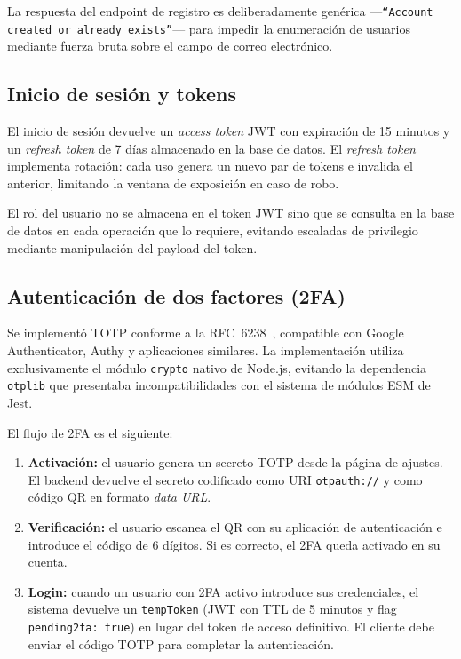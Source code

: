 La respuesta del endpoint de registro es deliberadamente genérica ---\texttt{``Account created or already exists''}--- para impedir la enumeración de usuarios mediante fuerza bruta sobre el campo de correo electrónico.

\subsection{Inicio de sesión y tokens}
El inicio de sesión devuelve un \emph{access token} JWT con expiración de 15 minutos y un \emph{refresh token} de 7 días almacenado en la base de datos. El \emph{refresh token} implementa rotación: cada uso genera un nuevo par de tokens e invalida el anterior, limitando la ventana de exposición en caso de robo.

El rol del usuario no se almacena en el token JWT sino que se consulta en la base de datos en cada operación que lo requiere, evitando escaladas de privilegio mediante manipulación del payload del token.

\subsection{Autenticación de dos factores (2FA)}
Se implementó TOTP conforme a la RFC~6238~\cite{rfc6238}, compatible con Google Authenticator, Authy y aplicaciones similares. La implementación utiliza exclusivamente el módulo \texttt{crypto} nativo de Node.js, evitando la dependencia \texttt{otplib} que presentaba incompatibilidades con el sistema de módulos ESM de Jest.

El flujo de 2FA es el siguiente:

\begin{enumerate}
  \item \textbf{Activación:} el usuario genera un secreto TOTP desde la página de ajustes. El backend devuelve el secreto codificado como URI \texttt{otpauth://} y como código QR en formato \emph{data URL}.
  \item \textbf{Verificación:} el usuario escanea el QR con su aplicación de autenticación e introduce el código de 6 dígitos. Si es correcto, el 2FA queda activado en su cuenta.
  \item \textbf{Login:} cuando un usuario con 2FA activo introduce sus credenciales, el sistema devuelve un \texttt{tempToken} (JWT con TTL de 5 minutos y flag \texttt{pending2fa: true}) en lugar del token de acceso definitivo. El cliente debe enviar el código TOTP para completar la autenticación.
\end{enumerate}

